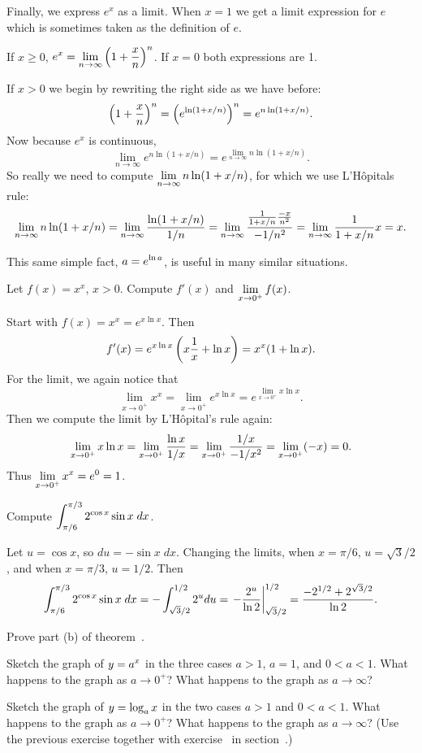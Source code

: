 Finally, we express $e^x$ as a limit. When $x=1$ we get a limit
expression for $e$ which is sometimes taken as the definition of
$e$.

\thm If $x\geq 0$,
$\displaystyle e^x = \lim_{n\to\infty} \left(
1+{x\over n}\right)^n$.
\endthm
\proof
If $x=0$ both expressions are 1.

If $x>0$ we begin by rewriting the right side as we have  before:
$$\left(1+{x\over n}\right)^n=\left(e^{\ln (1+x/n)}\right)^n=
e^{n\ln (1+x/n)}.$$
Now because $e^x$ is continuous,
$$\lim_{n\to\infty}e^{n\ln (1+x/n)}=e^{\lim_{n\to\infty}n\ln (1+x/n)}.$$
So really we need to compute $\displaystyle\lim_{n\to\infty}n\ln (1+x/n)$, for
which we use L'H\^opitals rule:
$$\lim_{n\to\infty}n\ln (1+x/n)=\lim_{n\to\infty}{\ln (1+x/n)\over 1/n}=
\lim_{n\to\infty}{{1\over 1+x/n}{-x\over n^2} \over -1/n^2}=
\lim_{n\to\infty}{1\over 1+x/n}x = x.$$
\endproof

This same simple fact, $\displaystyle a=e^{\ln a}$, is useful in many similar
situations.


\example Let $f(x) =x^x$, $x>0$. Compute $f'(x)$ and
$\displaystyle\lim_{x\to0^+} f(x)$.

Start with $f(x)=x^x = e^{x\ln x}$. Then 
$$f'(x)=e^{x\ln x}\left(x{1\over x}+\ln x\right)=x^x(1+\ln x).$$
For the limit, we again notice that
$$\lim_{x\to0^+} x^x = \lim_{x\to0^+}e^{x\ln x}
=e^{\lim_{x\to0^+} x\ln x}.$$
Then we compute the limit by L'H\^opital's rule again:
$$\lim_{x\to0^+}x\ln x = \lim_{x\to0^+}{\ln x\over 1/x}=
\lim_{x\to0^+}{1/x\over -1/x^2}=\lim_{x\to0^+}(-x)=0.$$
Thus $\displaystyle\lim_{x\to0^+} x^x=e^0=1$.
\endexample

\example Compute $\displaystyle\int_{\pi/6}^{\pi/3} 2^{\cos x} \sin x\; dx$.

Let $u=\cos x$, so $du=-\sin x\;dx $. Changing the limits, when
$x=\pi/6$, $u =\sqrt{3}/2$, and when $x=\pi/3$,
$u=1/2$. Then
$$\int_{\pi/6}^{\pi/3} 2^{\cos x} \sin x\;dx
 =-\int_{\sqrt{3}/2}^{1/2} 2^u du
= \left.-{2^u\over\ln 2}\right|_{\sqrt{3}/2}^{1/2} 
  ={-2^{1/2} +2^{\sqrt{3}/2}\over\ln 2}.$$
\endexample

\exercises

\exercise Prove part (b) of theorem~.
\endexercise

\exercise Sketch the graph of $\displaystyle y=a^x $ in the three cases $a>1$,
$a=1$, and $0<a< 1 $. What happens to the graph as $a\to 0^+$?
What happens to the graph as $a\to\infty $?
\endexercise

\exercise Sketch the graph of $\displaystyle y=\log_a x$ in the two cases $a>1$ and
$0<a< 1 $. What happens to the graph as $a\to 0^+$?  What happens to
the graph as $a\to\infty$? (Use the previous exercise together with
exercise~ in
section~.)

